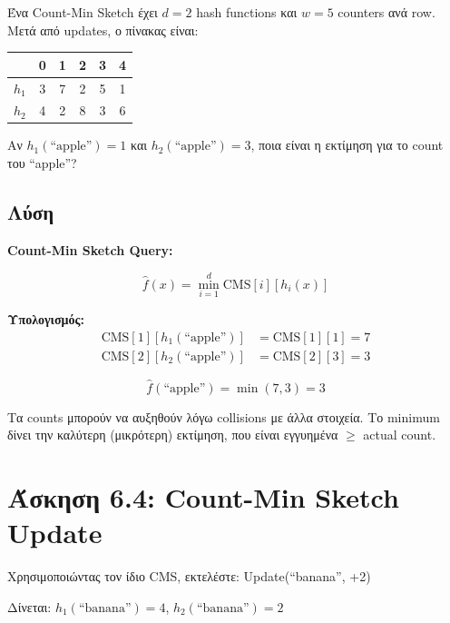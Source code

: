 \begin{formulabox}[Εκφώνηση]
Ένα Count-Min Sketch έχει $d = 2$ hash functions και $w = 5$ counters ανά row.
Μετά από updates, ο πίνακας είναι:

\begin{center}
\begin{tabular}{c|ccccc}
 & 0 & 1 & 2 & 3 & 4 \\
\hline
$h_1$ & 3 & 7 & 2 & 5 & 1 \\
$h_2$ & 4 & 2 & 8 & 3 & 6 \\
\end{tabular}
\end{center}

Αν $h_1(\text{``apple''}) = 1$ και $h_2(\text{``apple''}) = 3$, ποια είναι η εκτίμηση
για το count του ``apple''?
\end{formulabox}

\subsection*{Λύση}

\textbf{Count-Min Sketch Query:}

$$\hat{f}(x) = \min_{i=1}^{d} \text{CMS}[i][h_i(x)]$$

\textbf{Υπολογισμός:}
\begin{align*}
\text{CMS}[1][h_1(\text{``apple''})] &= \text{CMS}[1][1] = 7 \\
\text{CMS}[2][h_2(\text{``apple''})] &= \text{CMS}[2][3] = 3
\end{align*}

$$\hat{f}(\text{``apple''}) = \min(7, 3) = 3$$

\begin{infobox}
Τα counts μπορούν να αυξηθούν λόγω collisions με άλλα στοιχεία.
Το minimum δίνει την καλύτερη (μικρότερη) εκτίμηση, που είναι εγγυημένα $\geq$ actual count.
\end{infobox}

\section{Άσκηση 6.4: Count-Min Sketch Update}

\begin{formulabox}[Εκφώνηση]
Χρησιμοποιώντας τον ίδιο CMS, εκτελέστε: Update(``banana'', +2)

Δίνεται: $h_1(\text{``banana''}) = 4$, $h_2(\text{``banana''}) = 2$
\end{formulabox}

